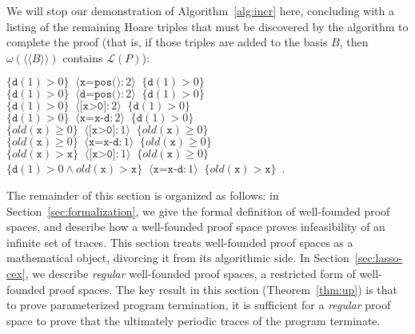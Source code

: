\documentclass[9pt,nocopyrightspace]{sigplanconf}
\theoremstyle{definition}
\newcommand{\tuple}[1]{\langle #1 \rangle}
\newcommand{\hoare}[3]{\{{#1}\}\;\;#2\;\;\{{#3}\}}
\newcommand{\closure}[1]{\langle\!\langle#1\rangle\!\rangle}
\newcommand{\ic}[2]{{\tuple{#1 : #2}}}
\newcommand{\lang}{\mathcal{L}}
\newcommand{\old}[1]{\textit{old}(#1)}
\begin{document}
We will stop our demonstration of Algorithm~\ref{alg:incr} here, concluding
with a listing of the remaining Hoare triples that must be discovered by the
algorithm to complete the proof (that is, if those triples are added to the
basis $B$, then $\omega(\closure{B})$ contains $\lang(P)$):
\begin{center}
    $\hoare{\texttt{d}(1) > 0}{\ic{\texttt{x=pos()}}{2}}{\texttt{d}(1) > 0}$\\
    $\hoare{\texttt{d}(1) > 0}{\ic{\texttt{d=pos()}}{2}}{\texttt{d}(1) > 0}$\\
    $\hoare{\texttt{d}(1) > 0}{\ic{\texttt{[x>0]}}{2}}{\texttt{d}(1) > 0}$\\
    $\hoare{\texttt{d}(1) > 0}{\ic{\texttt{x=x-d}}{2}}{\texttt{d}(1) > 0}$\\
    $\hoare{\old{\texttt{x}} \geq 0}{\ic{\texttt{[x>0]}}{1}}{\old{\texttt{x}} \geq 0}$\\
    $\hoare{\old{\texttt{x}} \geq 0}{\ic{\texttt{x=x-d}}{1}}{\old{\texttt{x}} \geq 0}$\\
    $\hoare{\old{\texttt{x}} > \texttt{x}}{\ic{\texttt{[x>0]}}{1}}{\old{\texttt{x}} \geq 0}$\\
    $\hoare{\texttt{d}(1) > 0 \land \old{\texttt{x}} > \texttt{x}}{\ic{\texttt{x=x-d}}{1}}{\old{\texttt{x}} > \texttt{x}}$\ .
  \end{center}

The remainder of this section is organized as follows: in
Section~\ref{sec:formalization}, we give the formal definition of well-founded
proof spaces, and describe how a well-founded proof space proves infeasibility
of an infinite set of traces.  This section treats well-founded proof spaces
as a mathematical object, divorcing it from its algorithmic side.  In
Section~\ref{sec:lasso-cex}, we describe \emph{regular} well-founded proof
spaces, a restricted form of well-founded proof spaces.  The key result in
this section (Theorem~\ref{thm:up}) is that to prove parameterized program
termination, it is sufficient for a \emph{regular} proof space to prove that
the ultimately periodic traces of the program terminate.
\end{document}
